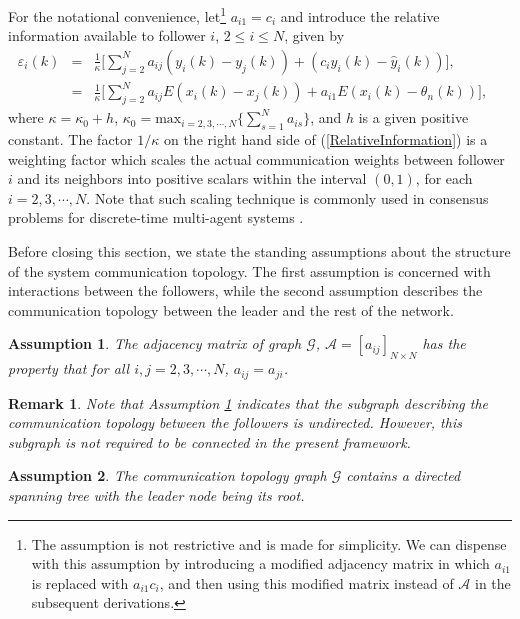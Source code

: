 \documentclass[a4paper,10pt,onecolumn]{article}
\newtheorem{assumption}{Assumption}
\newtheorem{remark}{Remark}
\begin{document}
For the notational convenience, let\footnote{The assumption is not restrictive and is made for simplicity. We can
  dispense with this assumption by introducing a modified adjacency matrix
  in which $a_{i1}$ is replaced with $a_{i1}c_{i}$, and then using this
  modified matrix instead of $\mathcal{A}$ in the subsequent derivations.} 
$a_{i1}=c_{i}$ and introduce the
relative information available to follower $i$, $2\leq i \leq N$, given by
\begin{eqnarray}\label{RelativeInformation}
\varepsilon_{i}(k)&=&
\frac{1}{\kappa}\!\bigg[\sum_{j=2}^{N}\!a_{ij}(y_{i}(k){-}y_{j}(k))
+\left(c_i y_{i}(k)-\hat y_i(k)\right)\!\bigg],\! \nonumber \\
&=&\frac{1}{\kappa}\!\bigg[\sum_{j=2}^{N}\!a_{ij}E(x_{i}(k){-}x_{j}(k)){+}a_{i1}E\left(x_{i}(k){-}\theta_{n}(k)\right)\!\bigg],\!
\quad
\end{eqnarray}
where $\kappa=\kappa_{0}+h$,
$\kappa_{0}=\mathrm{max}_{i=2,3,\cdots,N}\{\sum_{s=1}^{N}a_{is}\}$, 
and $h$ is a given positive constant. The factor $1/{\kappa}$ on the right
hand side of
(\ref{RelativeInformation}) is a weighting factor which scales the actual
communication weights between follower $i$ and its neighbors into
positive scalars within the interval $(0,1)$, for each
$i=2,3,\cdots,N$. Note that such scaling
technique is commonly used in  consensus problems for discrete-time multi-agent
systems \cite{Zhongkui-DCDB,Ren2005,ZhongkuiIJC}. 


Before closing this section, we state the standing assumptions about the
structure of the system communication topology. The first assumption is
concerned with interactions between the followers, while the second
assumption describes the communication topology between the leader and the
rest of the network.   

\begin{assumption}\label{AssumptionUndirected}
The adjacency matrix of graph $\mathcal{G}$, $\mathcal{A}=[a_{ij}]_{N\times
  N}$ has the property that for all $i,j=2,3,\cdots,N$, $a_{ij}=a_{ji}$.
\end{assumption}

\begin{remark}
Note that Assumption \ref{AssumptionUndirected} indicates that the subgraph
describing the communication topology between the followers is
undirected. However, this subgraph is not required to be connected in the
present framework. 
\end{remark}

\begin{assumption}\label{AssumptionSpanningTree}
The communication topology graph $\mathcal{G}$ contains a directed spanning
tree with the leader node being its root.
\end{assumption}
\end{document}

